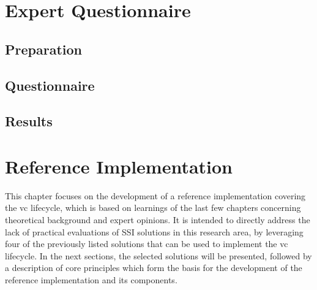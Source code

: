 
\chapter{Expert Questionnaire}\label{chapter: expert}

    
    \section{Preparation}

	\section{Questionnaire}

	\section{Results}\label{section: expert results}

\chapter{Reference Implementation}

This chapter focuses on the development of a reference implementation covering the \ac{vc} lifecycle, which is based on learnings of the last few chapters concerning theoretical background and expert opinions. It is intended to directly address the lack of practical evaluations of \ac{SSI} solutions in this research area, by leveraging four of the previously listed solutions that can be used to implement the \ac{vc} lifecycle. In the next sections, the selected solutions will be presented, followed by a description of core principles which form the basis for the development of the reference implementation and its components.

